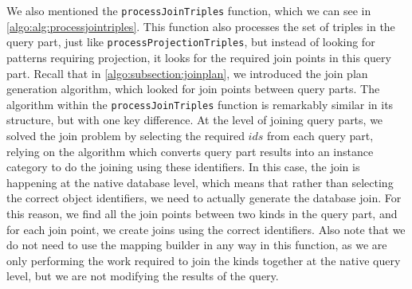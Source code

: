 We also mentioned the \texttt{processJoinTriples} function, which we can see in \cref{algo:alg:processjointriples}.
This function also processes the set of triples in the query part, just like \texttt{processProjectionTriples}, but instead of looking for patterns requiring projection, it looks for the required join points in this query part.
Recall that in \cref{algo:subsection:joinplan}, we introduced the join plan generation algorithm, which looked for join points between query parts.
The algorithm within the \texttt{processJoinTriples} function is remarkably similar in its structure, but with one key difference.
At the level of joining query parts, we solved the join problem by selecting the required $ids$ from each query part, relying on the algorithm which converts query part results into an instance category to do the joining using these identifiers.
In this case, the join is happening at the native database level, which means that rather than selecting the correct object identifiers, we need to actually generate the database join.
For this reason, we find all the join points between two kinds in the query part, and for each join point, we create joins using the correct identifiers.
Also note that we do not need to use the mapping builder in any way in this function, as we are only performing the work required to join the kinds together at the native query level, but we are not modifying the results of the query.

